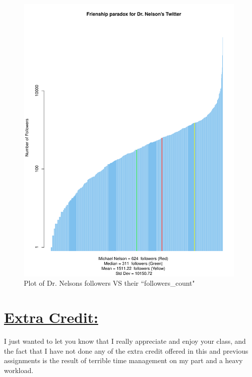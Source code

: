 \documentclass{article}
\begin{document}
\begin{figure}[H]
 \centering
 	\includegraphics[height = 20 cm]{twitter.pdf}
  \caption{Plot of Dr. Nelsons followers VS their ``followers\_count"}
\end{figure}

\newpage
\section*{{\underline{\huge {Extra Credit:}}}}
I just wanted to let you know that I really appreciate and enjoy your class, and the fact that I have not done any of the extra credit offered in this and previous assignments is the result of terrible time management on my part and a heavy workload.

\end{document}
